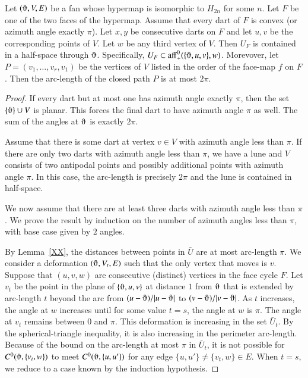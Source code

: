 \begin{lemma}\label{lemma:convex-hyper}  
Let $(\orgn,V,E)$ be a fan whose hypermap is isomorphic
to $H_{2n}$ for some $n$.  Let $F$ be one of the two faces of the hypermap.  Assume
that every dart of $F$ is convex (or azimuth angle exactly $\pi$).  Let $x,y$
be consecutive darts on $F$ and let $u,v$ be the corresponding points of $V$.
Let $w$ be any third vertex of $V$.  Then $U_F$
is contained in
a half-space through $\orgn$.  Specifically, $U_F\subset \op{aff}_+^0(\{\orgn,u,v\},w)$.
Morevover,
let $P=(v_1,\ldots,v_r,v_1)$ be the vertices of $V$ listed
in the order of the face-map $f$ on $F$.  Then the arc-length of the closed
path $P$ is at most $2\pi$.
\end{lemma}

\begin{proof}  If every dart but at most one 
has azimuth angle exactly $\pi$, then the set $\{\orgn\}\cup V$ is
planar.  This forces the final dart to have azimuth angle $\pi$ as well. 
The sum of the angles at $\orgn$ is exactly $2\pi$.

Assume that there is some dart at vertex $v\in V$ with azimuth angle less than $\pi$.
If there are only two darts with azimuth angle less than $\pi$, 
we have
a lune and $V$ consists of two antipodal points and possibly additional points
with azimuth angle $\pi$.  In this case, the arc-length
is precisely $2\pi$ and the lune is contained in half-space.

We now assume that there are at least three darts with azimuth angle less than $\pi$.
We prove the result by induction on the number of azimuth angles less than $\pi$,
with base case given by $2$ angles.

By Lemma~\ref{XX}, the distances between points in $\bar U$ are at most arc-length $\pi$.
We consider a deformation $(\orgn,V_t,E)$ such that the only vertex that moves is
$v$.  Suppose that $(u,v,w)$ are consecutive (distinct) vertices in the face cycle $F$.
Let $v_t$ be the point in the plane of $\{\orgn,u,v\}$ at distance $1$ from $\orgn$ that
is extended by arc-length $t$ beyond the arc from $(u-\orgn)/|u-\orgn|$ to $(v-\orgn)/|v-\orgn|$.
As $t$ increases, the angle at $w$ increases until for some value $t=s$, the angle
at $w$ is $\pi$.  The angle at $v_t$ remains between $0$ and $\pi$.  This deformation
is increasing in the set $\bar U_t$.  By the spherical-triangle inequality, it is
also increasing in the perimeter arc-length.   Because of the bound on the arc-length
at most $\pi$ in $\bar U_t$, it is not possible for $C^0(\orgn,\{v_t,w\})$ to meet
$C^0(\orgn,\{u,u'\})$ for any edge $\{u,u'\}\ne\{v_t,w\}\in E$.   
When $t=s$, we reduce to a case known by the induction hypothesis.
\end{proof}





